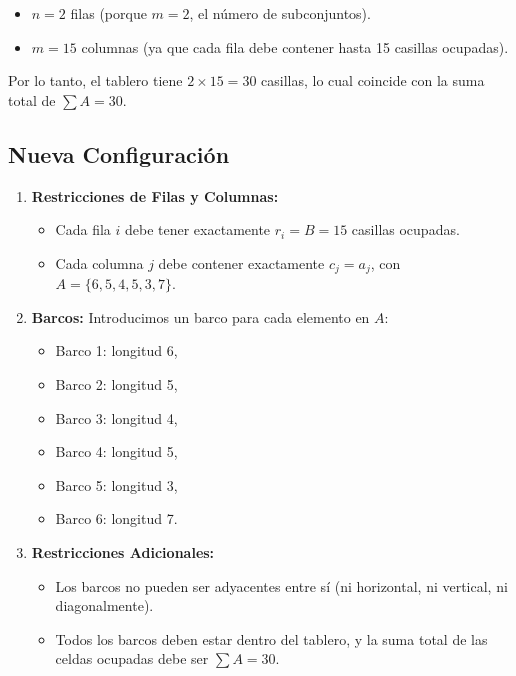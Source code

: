 \begin{itemize}
    \item $n = 2$ filas (porque $m = 2$, el número de subconjuntos).
    \item $m = 15$ columnas (ya que cada fila debe contener hasta 15 casillas ocupadas).
\end{itemize}

Por lo tanto, el tablero tiene $2 \times 15 = 30$ casillas, lo cual coincide con la suma total de $\sum A = 30$.

\subsection*{Nueva Configuración}

\begin{enumerate}
    \item \textbf{Restricciones de Filas y Columnas:}
    \begin{itemize}
        \item Cada fila $i$ debe tener exactamente $r_i = B = 15$ casillas ocupadas.
        \item Cada columna $j$ debe contener exactamente $c_j = a_j$, con $A = \{6, 5, 4, 5, 3, 7\}$.
    \end{itemize}

    \item \textbf{Barcos:}
    Introducimos un barco para cada elemento en $A$:
    \begin{itemize}
        \item Barco 1: longitud 6,
        \item Barco 2: longitud 5,
        \item Barco 3: longitud 4,
        \item Barco 4: longitud 5,
        \item Barco 5: longitud 3,
        \item Barco 6: longitud 7.
    \end{itemize}

    \item \textbf{Restricciones Adicionales:}
    \begin{itemize}
        \item Los barcos no pueden ser adyacentes entre sí (ni horizontal, ni vertical, ni diagonalmente).
        \item Todos los barcos deben estar dentro del tablero, y la suma total de las celdas ocupadas debe ser $\sum A = 30$.
    \end{itemize}
\end{enumerate}

